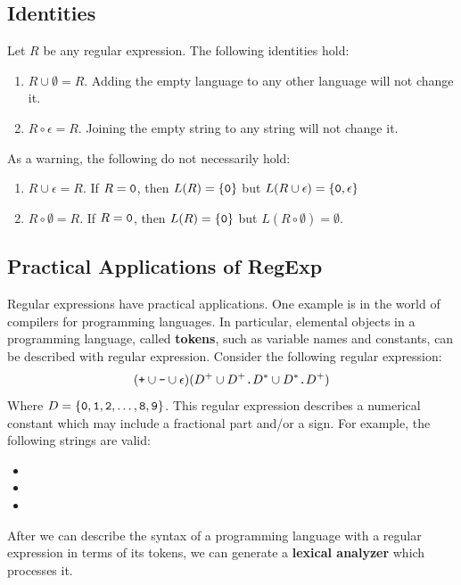 \documentclass[letterpaper]{article}
\begin{document}
\subsection{Identities}
Let $R$ be any regular expression. The following identities hold:
\begin{enumerate}
    \item $R \cup \emptyset = R$. Adding the empty language to any other language will not change it. 
    \item $R \circ \epsilon = R$. Joining the empty string to any string will not change it. 
\end{enumerate}
As a warning, the following do not necessarily hold: 
\begin{enumerate}
    \item $R \cup \epsilon = R$. If $R = \texttt{0}$, then $L(R) = \{\texttt{0}\}$ but $L(R \cup \epsilon) = \{\texttt{0}, \epsilon\}$
    \item $R \circ \emptyset = R$. If $R = \texttt{0}$, then $L(R) = \{\texttt{0}\}$ but $L(R \circ \emptyset) = \emptyset$. 
\end{enumerate}

\subsection{Practical Applications of RegExp}
Regular expressions have practical applications. One example is in the world of compilers for programming languages. In particular, elemental objects in a programming language, called \textbf{tokens}, such as variable names and constants, can be described with regular expression. Consider the following regular expression:
\[(\texttt{+} \cup \texttt{-} \cup \epsilon)(D^+ \cup D^+ \texttt{.} D^* \cup D^* \texttt{.} D^+)\]
Where $D = \{\texttt{0}, \texttt{1}, \texttt{2}, \dots, \texttt{8}, \texttt{9}\}$. This regular expression describes a numerical constant which may include a fractional part and/or a sign. For example, the following strings are valid: 
\begin{itemize}
    \item {}
    \item {}
    \item {}
\end{itemize}
After we can describe the syntax of a programming language with a regular expression in terms of its tokens, we can generate a \textbf{lexical analyzer} which processes it. 
\end{document}
